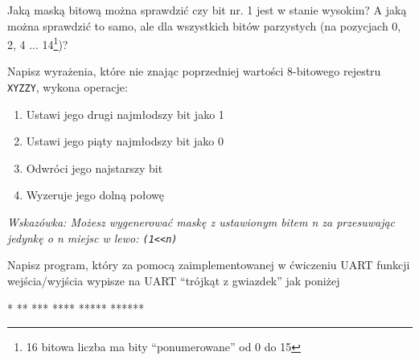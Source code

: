 \dbEntryCheckResults
  Jaką maską bitową można sprawdzić czy bit nr. 1 jest w stanie wysokim? A jaką można sprawdzić to samo, ale
  dla wszystkich bitów parzystych (na pozycjach 0, 2, 4 ... 14\footnote{16 bitowa liczba ma bity ``ponumerowane'' od 0 do 15})?
\fi

\dbEntryCheckResults
  Napisz wyrażenia, które nie znając poprzedniej wartości 8-bitowego rejestru \Verb$XYZZY$, wykona operacje:
  \begin{enumerate}
  \item Ustawi jego drugi najmłodszy bit jako 1
  \item Ustawi jego piąty najmłodszy bit jako 0
  \item Odwróci jego najstarszy bit
  \item Wyzeruje jego dolną połowę
  \end{enumerate}
  \textit{Wskazówka: Możesz wygenerować maskę z ustawionym bitem n za przesuwając jedynkę o n miejsc w lewo: \Verb$(1<<n)$}
\fi

\dbEntryCheckResults
Napisz program, który za pomocą zaimplementowanej w ćwiczeniu UART funkcji wejścia/wyjścia wypisze na UART ``trójkąt z gwiazdek'' jak poniżej

\begin{CodeFrame*}[text]{}
*
**
***
****
*****
******
\end{CodeFrame*}
\fi
